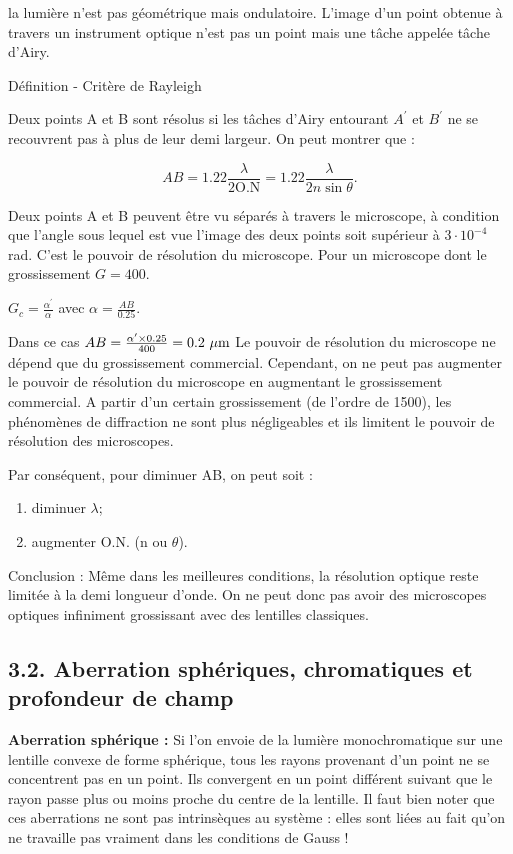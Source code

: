 \documentclass[french, a4paper, 10pt, twocolumn, landscape]{article}
\begin{document}
la lumière n'est pas géométrique mais ondulatoire. L'image d'un point obtenue à travers un instrument optique n'est pas un point mais une tâche appelée tâche d'Airy.


	\begin{definition}{Définition - Critère de Rayleigh}

		Deux points A et B sont résolus si les tâches d'Airy entourant $A^\prime$ et $B^\prime$ ne se recouvrent pas à plus de leur demi largeur. On peut montrer que : 

		$$AB = 1.22\frac{\lambda}{2\text{O.N}} = 1.22\frac{\lambda}{2n \sin\theta}.$$
	\end{definition}

Deux points A et B peuvent être vu séparés à travers le microscope, à condition que l'angle sous lequel est vue l'image des deux points soit supérieur à $3\cdot 10^{-4}$ rad. C'est le pouvoir de résolution du microscope. Pour un microscope dont le grossissement $G = 400$.


$G_c=\frac{\alpha^\prime}{\alpha}$ avec $\alpha=\frac{AB}{0.25}$.\medskip

Dans ce cas $AB = \frac{\alpha^\prime \times 0.25}{400} = 0.2~\rm\mu m$ Le pouvoir de résolution du microscope ne dépend que du grossissement commercial. Cependant, on ne peut pas augmenter le pouvoir de résolution du microscope en augmentant le grossissement commercial. A partir d’un certain grossissement (de l’ordre de 1500), les phénomènes de diffraction ne sont plus négligeables et ils limitent le pouvoir de résolution des microscopes.\medskip

Par conséquent, pour diminuer AB, on peut soit : 
\begin{enumerate}
	\item diminuer $\lambda$;
	\item augmenter O.N. (n ou $\theta$).
\end{enumerate}

Conclusion : Même dans les meilleures conditions, la résolution optique reste limitée à la demi longueur d'onde. On ne peut donc pas avoir des microscopes optiques infiniment grossissant avec des lentilles classiques.

\subsection*{3.2. Aberration sphériques, chromatiques et  profondeur de champ}

\textbf{Aberration sphérique :} Si l’on envoie de la lumière monochromatique sur une lentille convexe de forme sphérique, tous les rayons provenant d’un point ne se concentrent pas en un point. Ils convergent en un point différent suivant que le rayon passe plus ou moins proche du centre de la lentille. Il faut bien noter que ces aberrations ne sont pas intrinsèques au système : elles sont liées au fait qu’on ne travaille pas vraiment dans les conditions de Gauss ! 
\end{document}
